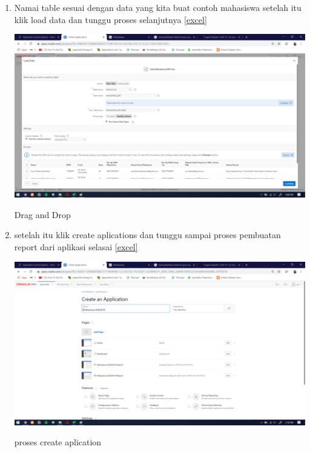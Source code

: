 \documentclass{article}
\begin{document}
\begin{enumerate}
     \item Namai table sesuai dengan data yang kita buat contoh mahasiswa setelah itu klik load data dan tunggu proses selanjutnya
      \ref{excel}
    \begin{center}
         \centering
            \includegraphics[scale=0.27]{figures/DB4.png}
        \caption{Drag and Drop}
        \label{excel}
    \end{center}
    
     \item setelah itu klik create aplications dan tunggu sampai proses pembuatan report dari aplikasi selasai
      \ref{excel}
    \begin{center}
         \centering
            \includegraphics[scale=0.27]{figures/DB5.png}
        \caption{proses create aplication}
        \label{excel}
    \end{center}
    

\end{enumerate}
\end{document}

